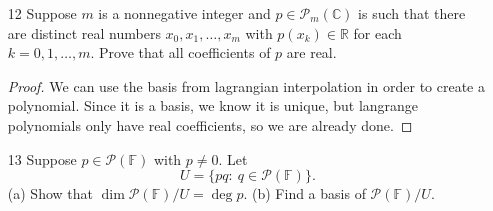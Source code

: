 \begin{enumerate}
    \begin{proof}
        First we show that $\frac{p(x) - p(3)}{x - 3}$ is a polynomial for $x \neq 3$. Suppose that 

        \[p(x) = a_0 + a_1x + \dots + a_nx^n\]

        Then, 

        \begin{align*}
            \frac{p(x) - p(3)}{x - 3} &= \frac{a_1(x-3) + \dots + a_n(x^n-3^n)}{x-3} \\
            &= a_1 + a_2(x + 3) + a_3(x^2 + 3x + 3^2) + \dots + a_n(x^{n-1} + 3x^{n-2} + \dots + 3^{n-1})
        \end{align*}

        Since each of those terms above has a factor of $x-3$ (by difference of powers factorization), we can divide out the $x - 3$ (if $x\neq 3$) to retrieve a polynomial. If we show that this polynomial equals $p'(3)$ at $x = 3$ we will be done. Now, 

        \[p'(3) = a_1 + 3 \cdot 2a_2 + 3^2 \cdot 3a_3 + \dots + 3^n \cdot na_n\]

        When plugging 3 into the equation we get above, we see that they are indeed idenitcal, since all the $x^{n - i - 1}3^i$ terms just turn into $3^{n - 1}$, and they all collect up.

        This is a linear map because it simply uses the coefficients of the polynomial and multiplies them by a different polynomial than the standard $x^i$. It is clearly additive and 0 is mapped to 0.

    \end{proof}

    \item[12] Suppose $m$ is a nonnegative integer and $p \in \mathcal{P}_m(\mathbb{C})$ is such that there are distinct real numbers
    $x_0, x_1, \dots, x_m$ with $p(x_k) \in \mathbb{R}$ for each $k = 0, 1, \dots, m$.
    Prove that all coefficients of $p$ are real.

    \begin{proof}
        We can use the basis from lagrangian interpolation in order to create a polynomial. Since it is a basis, we know it is unique, but langrange polynomials only have real coefficients, so we are already done.
    \end{proof}

    \item[13] Suppose $p\in\mathcal P(\mathbb F)$ with $p\neq0$. Let
    \[U=\{pq:\ q\in\mathcal P(\mathbb F)\}.\]
    (a) Show that $\dim\mathcal P(\mathbb F)/U=\deg p$. 
    (b) Find a basis of $\mathcal P(\mathbb F)/U$.


\end{enumerate}
